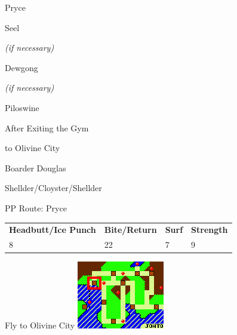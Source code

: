 \begin{paracol}{2}
\begin{boss}{Pryce}
	\varwb
	\begin{fightSection}{Seel}
		\item {} \strength
		\begin{notes}
			\small{\item {} \bite{} \textit{(if necessary)}}
		\end{notes}
	\end{fightSection}
	\begin{fightSection}{Dewgong}
		\item {} \strength{} \bossHlTwo{2x}
		\begin{notes}
			\small{\item {} \bite{} \textit{(if necessary)}}
		\end{notes}
	\end{fightSection}
	\begin{fightSection}{Piloswine}
		\item {} \surf
	\end{fightSection}
	\varwe
\end{boss}

\begin{menu}{After Exiting the Gym}
	\varwb
	\begin{pokeMenu}
		\item {} \fly{} to Olivine City \menuHlTwo{(4\pointDown)}
	\end{pokeMenu}
	\varwe
\end{menu}

\switchcolumn
\begin{trainer}{Boarder Douglas}
	\varwb
	\begin{fightSection}{Shellder/Cloyster/Shellder}
		\item {} \bite{} \trainerHlTwo{4x}
	\end{fightSection}
	\varwe
\end{trainer}

\begin{misc}{PP Route: Pryce}
	\varwb
	\begin{tabu} to \textwidth {X[6,c] X[5,c] X[4,c] X[4,c]}
		\textbf{Headbutt/Ice Punch} & \textbf{Bite/Return} & \textbf{Surf} & \textbf{Strength}\\ 
		8 & 22 & 7 & 9
	\end{tabu}
	\varwe
\end{misc}

\begin{story}{Fly to Olivine City}
	\varwb
	\includegraphics[scale=1.045]{../Graphics/10. Olivine City.png}
	\varwe
\end{story}

\end{paracol}
\vspace{3.5mm}